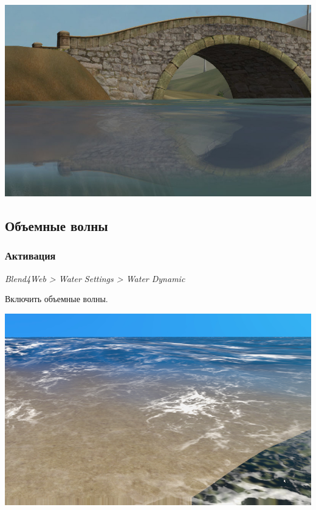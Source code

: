 \documentclass[a4paper,12pt,oneside]{sphinxmanual}
\begin{document}
{\hfill\includegraphics[width=1.000\linewidth]{water_border.jpg}\hfill}


\subsection{Объемные волны}
\label{outdoor_rendering:id20}\label{outdoor_rendering:water-volumetric-waves}

\subsubsection{Активация}
\label{outdoor_rendering:id21}
\emph{Blend4Web \textgreater{} Water Settings \textgreater{} Water Dynamic}

Включить объемные волны.

{\hfill\includegraphics[width=1.000\linewidth]{water_waves.jpg}\hfill}
\end{document}

